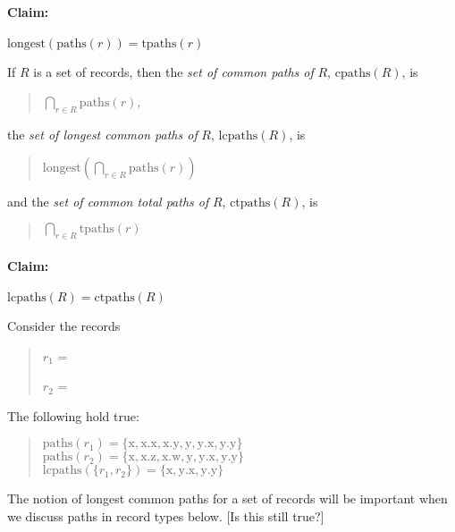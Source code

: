 \paragraph{Claim:}
$\mathrm{longest}(\mathrm{paths}(r))=\mathrm{tpaths}(r)$

If $R$ is a set of records, then 
the \textit{set of common paths of} $R$,
$\mathrm{cpaths}(R)$,\label{pg:cpaths} is
\begin{quote}
$\displaystyle{\bigcap_{r\in R}}\mathrm{paths}(r)$,
\end{quote}
the \textit{set of longest common
  paths of} $R$, $\mathrm{lcpaths}(R)$, is
\begin{quote}
$\mathrm{longest}(\displaystyle{\bigcap_{r\in R}}\mathrm{paths}(r))$
\end{quote} 
and the \textit{set of common total paths of} $R$,
$\mathrm{ctpaths}(R)$,\label{pg:ctpaths} is
\begin{quote}
$\displaystyle{\bigcap_{r\in R}}\mathrm{tpaths}(r)$
\end{quote}

\paragraph{Claim:} $\mathrm{lcpaths}(R)=\mathrm{ctpaths}(R)$



Consider the records
\begin{quote}
$r_1$ = 

$r_2$ = 
\end{quote}
The following hold true:
\begin{quote}
$\mathrm{paths}(r_1) = \{\mathrm{x},\mathrm{x.x},\mathrm{x.y},\mathrm{y},\mathrm{y.x},\mathrm{y.y}\}$\\
$\mathrm{paths}(r_2) = \{\mathrm{x},\mathrm{x.z},\mathrm{x.w},\mathrm{y},\mathrm{y.x},\mathrm{y.y}\}$\\
$\mathrm{lcpaths}(\{r_1,r_2\}) = \{\mathrm{x},\mathrm{y.x},\mathrm{y.y}\}$
\end{quote} 
The notion of longest common paths for a set of records will be
important when we discuss paths in record types below.  [Is this still true?] 
  

